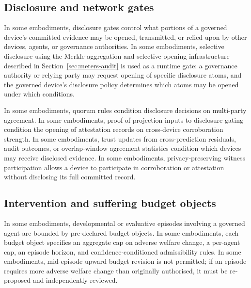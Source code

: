 \documentclass[a4paper,12pt]{article}
\begin{document}

\subsection{Disclosure and network gates}


In some embodiments, disclosure gates control what portions of a
governed device's committed evidence may be opened, transmitted, or
relied upon by other devices, agents, or governance authorities. In
some embodiments, selective disclosure using the Merkle-aggregation
and selective-opening infrastructure described in
Section~\ref{sec:meters-audit} is used as a runtime gate: a governance
authority or relying party may request opening of specific disclosure
atoms, and the governed device's disclosure policy determines which
atoms may be opened under which conditions.

In some embodiments, quorum rules condition disclosure decisions on
multi-party agreement. In some embodiments, proof-of-projection inputs
to disclosure gating condition the opening of attestation records on
cross-device corroboration strength. In some embodiments, trust
updates from cross-prediction residuals, audit outcomes, or
overlap-window agreement statistics condition which devices may receive
disclosed evidence. In some embodiments, privacy-preserving witness
participation allows a device to participate in corroboration or
attestation without disclosing its full committed record.

\subsection{Intervention and suffering budget objects}
\label{sec:budgets}

In some embodiments, developmental or evaluative episodes involving a
governed agent are bounded by pre-declared budget objects. In some
embodiments, each budget object specifies an aggregate cap on adverse
welfare change, a per-agent cap, an episode horizon, and
confidence-conditioned admissibility rules. In some embodiments,
mid-episode upward budget revision is not permitted; if an episode
requires more adverse welfare change than originally authorised, it
must be re-proposed and independently reviewed.
\end{document}
